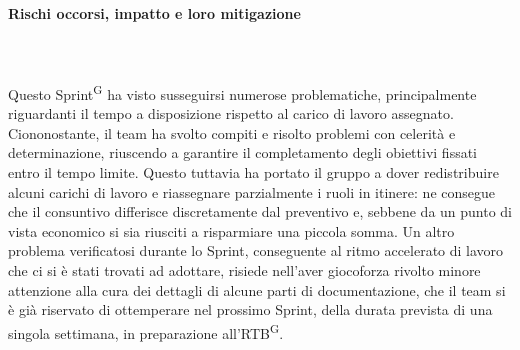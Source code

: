 \documentclass[8pt]{article}
\newcommand{\glossterm}[1]{#1\textsuperscript{G}} %
\newcommand{\subsubsubsection}[1]{\paragraph{#1}\mbox{}\\}
\begin{document}
\subsubsubsection{Rischi occorsi, impatto e loro mitigazione}\\
Questo \glossterm{Sprint} ha visto susseguirsi numerose problematiche, principalmente riguardanti
il tempo a disposizione rispetto al carico di lavoro assegnato. Ciononostante, il team ha svolto compiti e risolto problemi con celerità
e determinazione, riuscendo a garantire il completamento degli obiettivi fissati entro il tempo
limite. Questo tuttavia ha portato il gruppo a dover redistribuire alcuni carichi di lavoro e
riassegnare parzialmente i ruoli in itinere: ne consegue che il consuntivo differisce discretamente 
dal preventivo e, sebbene da un punto di vista economico si sia riusciti a risparmiare una piccola
somma.
Un altro problema verificatosi durante lo Sprint, conseguente al ritmo accelerato di lavoro che ci si è stati trovati ad adottare, 
risiede nell'aver giocoforza rivolto minore attenzione alla cura dei dettagli di alcune parti di documentazione, che il team 
si è già riservato di ottemperare nel prossimo Sprint, della durata prevista di una singola settimana, in preparazione all'\glossterm{RTB}.
\end{document}
